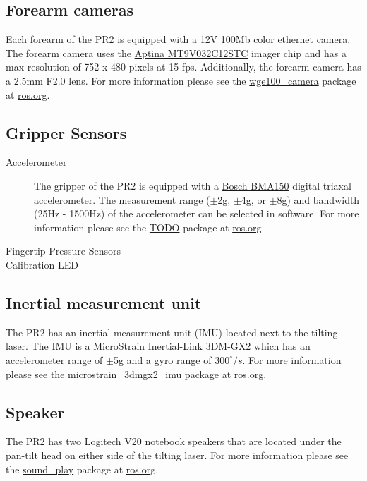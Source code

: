 \subsection{Forearm cameras}
Each forearm of the PR2 is equipped with a 12V 100Mb color ethernet camera. The forearm camera uses the 
\href{http://www.aptina.com/products/image_sensors/mt9v032c12stc/#overview}{Aptina MT9V032C12STC}  imager chip
and has a max resolution of 752 x 480 pixels at 15 fps. Additionally, the forearm camera has a 2.5mm F2.0 lens.  
For more information please see the \href{http://www.ros.org/wiki/wge100_camera}{wge100\_camera} package
at \href{http://www.ros.org}{ros.org}.

\subsection{Gripper Sensors}
\begin{description}

\item[Accelerometer]
The gripper of the PR2 is equipped with a \href{http://www.bosch-sensortec.com/content/language1/html/3474.htm}{Bosch BMA150} 
digital triaxal accelerometer. The measurement range ($\pm$2g, $\pm$4g, or $\pm$8g) and bandwidth (25Hz - 1500Hz) 
of the accelerometer can be selected in software. For more information please see the \href{http://www.ros.org/wiki/wge100_camera}{TODO} 
package at \href{http://www.ros.org}{ros.org}.

\item[Fingertip Pressure Sensors]


\item[Calibration LED]

\end{description}

\subsection{Inertial measurement unit}
The PR2 has an inertial measurement unit (IMU) located next to the tilting laser. The IMU is a 
\href{http://www.microstrain.com/3dm-gx2.aspx}{MicroStrain Inertial-Link 3DM-GX2} which has an 
accelerometer range of $\pm$5g and a gyro range of $300^\circ/s$. For more information please see 
the \href{http://www.ros.org/wiki/microstrain_3dmgx2_imu}{microstrain\_3dmgx2\_imu} package at \href{http://www.ros.org}{ros.org}.

\subsection{Speaker}
The PR2 has two \href{http://www.logitech.com/index.cfm/speakers_audio/home_pc_speakers/devices/199&cl=us,en}{Logitech V20 notebook speakers} 
that are located under the pan-tilt head on either side of the tilting laser. For more information please 
see the \href{http://www.ros.org/wiki/sound_play}{sound\_play} package at \href{http://www.ros.org}{ros.org}.


